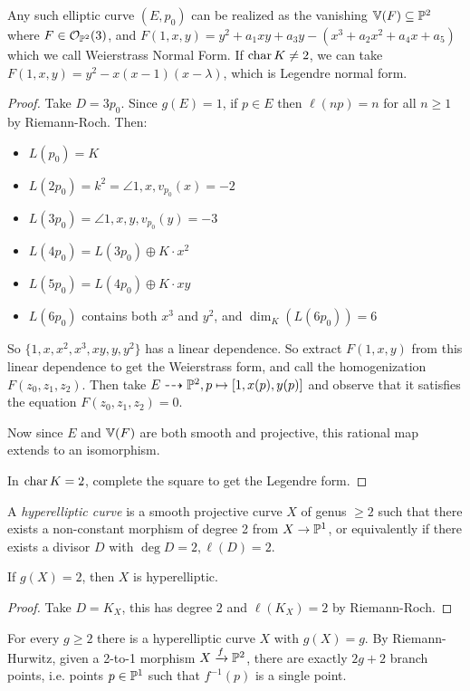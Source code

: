 \documentclass[10pt,a4paper,rgb]{article}
\begin{document}
\begin{theorem}
Any such elliptic curve $(E,p_0)$ can be realized as the vanishing $\V(F) \subseteq \P^2$ where $F \in \mathcal{O}_{\P^2}(3)$, and $F(1,x,y) = y^2+a_1xy+a_3y - (x^3+a_2x^2+a_4x +a_5)$ which we call Weierstrass Normal Form. If $\charr K \neq 2$, we can take $F(1,x,y) = y^2-x(x-1)(x-\lambda)$, which is Legendre normal form.
\end{theorem}
\begin{proof}
Take $D = 3p_0$. Since $g(E) = 1$, if $p \in E$ then $\ell(np) = n$ for all $n \geq 1$ by Riemann-Roch. Then:
\begin{itemize}
\item $L(p_0) = K$
\item $L(2p_0) = k^2 = \angle{1,x}, v_{p_0}(x) = -2$
\item $L(3p_0) = \angle{1,x,y}, v_{p_0}(y) = -3$
\item $L(4p_0) = L(3p_0) \oplus K\cdot x^2$
\item $L(5p_0) = L(4p_0)\oplus K\cdot xy$
\item $L(6p_0)$ contains both $x^3$ and $y^2$, and $\dim_K(L(6p_0)) = 6$
\end{itemize}
So $\{1,x,x^2,x^3,xy,y,y^2\}$ has a linear dependence. So extract $F(1,x,y)$ from this linear dependence to get the Weierstrass form, and call the homogenization $F(z_0, z_1, z_2)$. Then take $E \dashrightarrow \P^2, p \mapsto [1, x(p), y(p)]$ and observe that it satisfies the equation $F(z_0, z_1, z_2) = 0$.

Now since $E$ and $\V(F)$ are both smooth and projective, this rational map extends to an isomorphism.

In $\charr K = 2$, complete the square to get the Legendre form.
\end{proof}

A \emph{hyperelliptic curve} is a smooth projective curve $X$ of genus $\geq 2$ such that there exists a non-constant morphism of degree 2 from $X \to \P^1$, or equivalently if there exists a divisor $D$ with $\deg D = 2, \ell(D) = 2.$
\begin{lemma}
If $g(X) = 2$, then $X$ is hyperelliptic.
\end{lemma}
\begin{proof}
Take $D = K_X$, this has degree $2$ and $\ell(K_X) = 2$ by Riemann-Roch.
\end{proof}
For every $g \geq 2$ there is a hyperelliptic curve $X$ with $g(X) = g$. By Riemann-Hurwitz, given a 2-to-1 morphism $X \xrightarrow{f}\P^2$, there are exactly $2g+2$ branch points, i.e. points $p \in \P^1$ such that $f^{-1}(p)$ is a single point.
\end{document}
